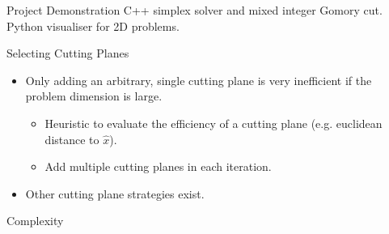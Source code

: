\begin{frame}{Project Demonstration}
C++ simplex solver and mixed integer Gomory cut. Python visualiser for 2D problems.

%    
\end{frame}

\begin{frame}{Selecting Cutting Planes}
\begin{itemize}[<+->]
\item Only adding an arbitrary, single cutting plane is very inefficient if the problem dimension is large.
\begin{itemize}
\item Heuristic to evaluate the efficiency of a cutting plane (e.g. euclidean distance to $\hat{x}$).
\item Add multiple cutting planes in each iteration.
\end{itemize}
\item Other cutting plane strategies exist. %
\end{itemize}
\end{frame}

\begin{frame}{Complexity}
\end{frame}